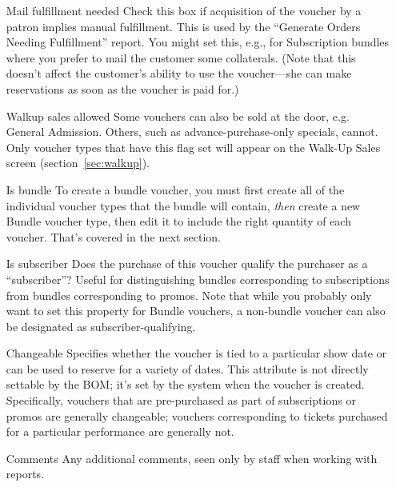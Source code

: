 \begin{itemize}

\item[Mail fulfillment needed] Check this box if acquisition of the
  voucher by a patron implies manual fulfillment.  This is used by the
  ``Generate Orders Needing Fulfillment'' report.  You might set this,
  e.g., for Subscription bundles where you prefer to mail the customer
  some collaterals.  (Note that this doesn't affect the customer's
  ability to use the voucher---she can make reservations as soon as the
  voucher is paid for.)
\item[Walkup sales allowed] Some vouchers can also be sold at the door,
  e.g. General Admission.  Others, such as advance-purchase-only
  specials, cannot.  Only voucher types that have this flag set will
  appear on the Walk-Up Sales screen (section~\ref{sec:walkup}).

\item[Is bundle] To create a bundle voucher, you must first create all
  of the individual voucher types that the bundle will contain,
  \emph{then} create a new Bundle voucher type, then edit it to include
  the right quantity of each voucher.  That's covered in the next section.
\item[Is subscriber] Does the purchase of this voucher qualify the
  purchaser as a ``subscriber''?  Useful for distinguishing bundles
  corresponding to subscriptions from bundles corresponding to promos.
  Note that while you probably only want to set this property for Bundle
  vouchers, a non-bundle voucher can also be designated as
  subscriber-qualifying. 
\item[Changeable] Specifies whether the voucher is tied to a particular
  show date or can be used to reserve for a variety of dates. This
  attribute is not directly settable by the BOM; it's set by the system
  when the voucher is created.  Specifically, vouchers that are
  pre-purchased as part of subscriptions or promos are generally
  changeable; vouchers corresponding to tickets purchased for a
  particular performance are generally not.
\item[Comments] Any additional comments, seen only by staff when working
  with reports.
\end{itemize}


